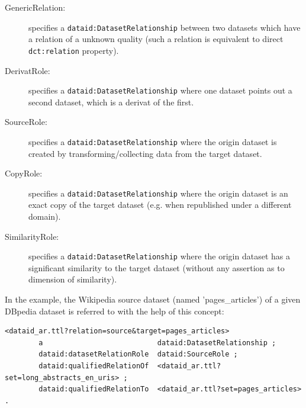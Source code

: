 \documentclass[a4paper,english,twoside,BCOR1.5cm,headsepline,DIV12,appendixprefix,final,12pt]{scrbook}
\newcommand{\prop}[1]{{{\texttt{#1}}}}
\begin{document}
\begin{description}
\item[GenericRelation:] specifies a \prop{dataid:DatasetRelationship} between two datasets which have a relation of a unknown quality (such a relation is equivalent to direct \prop{dct:relation} property).
\item[DerivatRole:] specifies a \prop{dataid:DatasetRelationship} where one dataset points out a second dataset, which is a derivat of the first.
\item[SourceRole:] specifies a \prop{dataid:DatasetRelationship} where the origin dataset is created by transforming/collecting data from the target dataset.
\item[CopyRole:] specifies a \prop{dataid:DatasetRelationship} where the origin dataset is an exact copy of the target dataset (e.g. when republished under a different domain).
\item[SimilarityRole:] specifies a \prop{dataid:DatasetRelationship} where the origin dataset has a significant similarity to the target dataset (without any assertion as to dimension of similarity).
\end{description}

In the example, the Wikipedia source dataset (named 'pages\_articles') of a given DBpedia dataset is referred to with the help of this concept:
\\
\begin{lstlisting}[language=ttl, captionpos=b,caption=Example of an organisation,label=lst:coresuperset,linewidth=\columnwidth,breaklines=true]
<dataid_ar.ttl?relation=source&target=pages_articles>
        a                           dataid:DatasetRelationship ;
        dataid:datasetRelationRole  dataid:SourceRole ;
        dataid:qualifiedRelationOf  <dataid_ar.ttl?set=long_abstracts_en_uris> ;
        dataid:qualifiedRelationTo  <dataid_ar.ttl?set=pages_articles> .  
\end{lstlisting}
\end{document}
